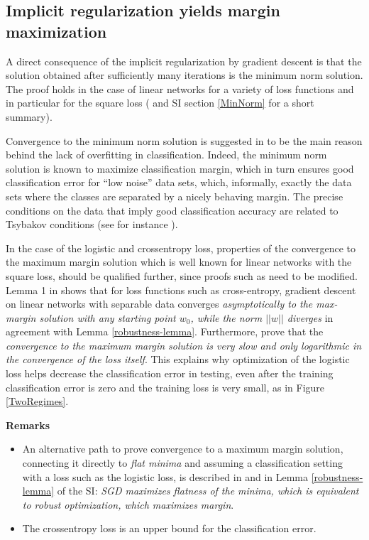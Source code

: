 \documentclass[10pt]{article}
\begin{document}
 
\subsection{Implicit regularization yields margin maximization}
\label{marginsection}

A direct consequence of the implicit regularization by gradient
descent is that the solution obtained after sufficiently many
iterations is the minimum norm solution.  The proof holds in the case
of linear networks for a variety of loss functions and in particular
for the square loss
(\cite{DBLP:journals/corr/ZhangBHRV16} and SI section \ref{MinNorm}
for a short summary).

Convergence to the minimum norm solution is suggested in
\cite{2017arXiv171010345S} to be the main reason behind the lack of
overfitting in classification. Indeed, the minimum norm solution is
known to maximize classification margin, which in turn ensures good
classification error for ``low noise'' data sets, which, informally,
exactly the data sets where the classes are separated by a nicely
behaving margin.  The precise conditions on the data that imply good
classification accuracy are related to Tsybakov conditions (see for
instance \cite{Yao2007}).

In the case of the logistic and crossentropy loss, properties of the
convergence to the maximum margin solution which is well known for
linear networks with the square loss, should be qualified further,
since proofs such as \cite{DBLP:journals/corr/ZhangBHRV16} need to be
modified.   Lemma 1 in \cite{2017arXiv171010345S} shows that for loss
functions such as cross-entropy, gradient descent on linear networks
with separable data converges {\it asymptotically to the max-margin
  solution with any starting point $w_0$, while the norm $||w||$
  diverges} in agreement with Lemma
\ref{robustness-lemma}. Furthermore, \cite{2017arXiv171010345S} prove
that the {\it convergence to the maximum margin solution is very slow
  and only logarithmic in the convergence of the loss itself}. This
explains why optimization of the logistic loss helps decrease the
classification error in testing, even after the training
classification error is zero and the training  loss is very small, as
in Figure \ref{TwoRegimes}. 


{\bf Remarks}

\begin{itemize}
\item An alternative path to prove convergence to a maximum margin
  solution, connecting it directly to {\it flat minima} and assuming a
  classification setting with a loss such as the logistic loss, is
  described in \cite{Musings2017} and in Lemma \ref{robustness-lemma}
  of the SI: {\it SGD maximizes flatness of the minima, which is
    equivalent to robust optimization, which maximizes margin}.

\item The crossentropy loss is an upper bound for the classification error. 

\end{itemize}
\end{document}
